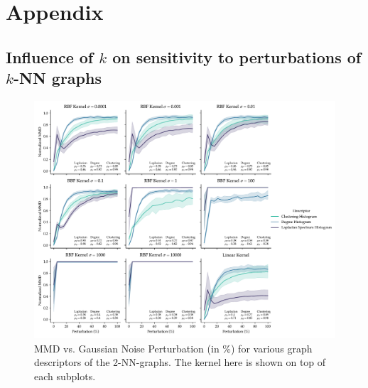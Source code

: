 \chapter{Appendix}

\section{Influence of $k$ on sensitivity to perturbations of $k$-NN graphs}

\begin{figure}[h]
  \centering
  \includegraphics[width=\textwidth]{./figures/results/res_1_5.pdf}
  \caption[MMD vs. Gaussian Noise Perturbation (in \%) for various graph descriptors of the
  2-NN-graphs.]{MMD vs. Gaussian Noise Perturbation (in \%) for various graph descriptors of the
    2-NN-graphs. The kernel here is shown on top of each subplots.}
  \label{fig:mmd_effect_kernel_knn}
\end{figure}

